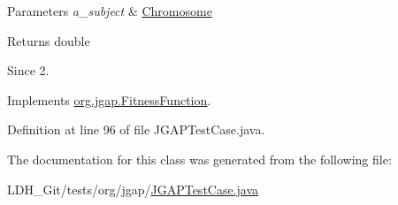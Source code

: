 \begin{DoxyParams}{Parameters}
{\em a\-\_\-subject} & \hyperlink{classorg_1_1jgap_1_1_chromosome}{Chromosome} \\
\hline
\end{DoxyParams}
\begin{DoxyReturn}{Returns}
double 
\end{DoxyReturn}
\begin{DoxySince}{Since}
2. 
\end{DoxySince}


Implements \hyperlink{classorg_1_1jgap_1_1_fitness_function_a0078e42480eac93729f906ac4dc185d9}{org.\-jgap.\-Fitness\-Function}.



Definition at line 96 of file J\-G\-A\-P\-Test\-Case.\-java.



The documentation for this class was generated from the following file\-:\begin{DoxyCompactItemize}
\item 
L\-D\-H\-\_\-\-Git/tests/org/jgap/\hyperlink{_j_g_a_p_test_case_8java}{J\-G\-A\-P\-Test\-Case.\-java}\end{DoxyCompactItemize}
